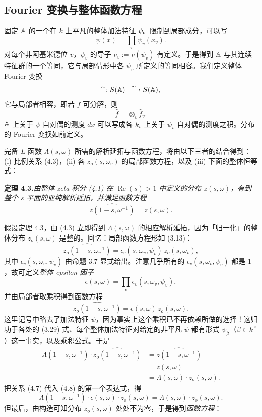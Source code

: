 \subsection*{Fourier 变换与整体函数方程}

固定 $\mathbb{A}$ 的一个在 $k$ 上平凡的整体加法特征 $\psi$。限制到局部成分，可以写
\[
\psi(x)=\prod_v\psi_v(x_v).
\]
对每个非阿基米德位 $v$，$\psi_v$ 的导子 $\nu_v:=\nu(\psi_v)$ 有定义。于是得到 $\mathbb{A}$ 与其连续特征群的一个等同，它与局部情形中各 $\psi_v$ 所定义的等同相容。我们定义整体 Fourier 变换
\[
\widehat{\ }:S(\A)\xrightarrow{\ \sim\ }S(\A),
\]
它与局部者相容，即若 $f$ 可分解，则
\[
\hat f=\otimes_v\hat f_v.
\]
$\mathbb{A}$ 上关于 $\psi$ 自对偶的测度 $dx$ 可以写成各 $k_v$ 上关于 $\psi_v$ 自对偶的测度之积。分布的 Fourier 变换如前定义。

完备 $L$ 函数 $\Lambda(s,\omega)$ 所需的解析延拓与函数方程，将由以下三者的结合得到：(i) 比例关系 (4.3)，(ii) 各 $z_o(s,\omega_v)$ 的局部函数方程，以及 (iii) 下面的整体恒等式：

\medskip\noindent\textbf{定理 4.3.}\quad \emph{由整体 zeta 积分 (4.1) 在 $\operatorname{Re}(s)>1$ 中定义的分布 $z(s,\omega)$，有到整个 $s$ 平面的亚纯解析延拓，并满足函数方程}
\[
\widehat{z(1-s,\omega^{-1})}=z(s,\omega).
\]

假设定理 4.3，由 (4.3) 立即得到 $\Lambda(s,\omega)$ 的相应解析延拓，因为「归一化」的整体分布 $z_o(s,\omega)$ 是整的。回忆：局部函数方程形如 (3.13)：
\[
\widehat{z_o(1-s,\omega_v^{-1})}=\epsilon_v(s,\omega_v,\psi_v)\,z_o(s,\omega_v),
\]
其中 $\epsilon_v(s,\omega_v,\psi_v)$ 由命题 3.7 显式给出。注意几乎所有的 $\epsilon_v(s,\omega_v,\psi_v)$ 都是 $1$，故可定义\emph{整体 epsilon 因子}
\begin{equation*}\tag{4.6}
\epsilon(s,\omega)=\prod_v\epsilon_v(s,\omega_v,\psi_v),
\end{equation*}
并由局部者取乘积得到函数方程
\begin{equation*}\tag{4.7}
\widehat{z_o(1-s,\omega^{-1})}=\epsilon(s,\omega)\,z_o(s,\omega).
\end{equation*}
这里记号中略去了加法特征 $\psi$，因为事实上这个乘积已不再依赖所做的选择！这归功于各处的 (3.29) 式、每个整体加法特征对给定的非平凡 $\psi$ 都有形式 $\psi_\beta$（$\beta\in k^\times$）这一事实，以及乘积公式。于是
\begin{equation*}\tag{4.8}
\begin{aligned}
\Lambda(1-s,\omega^{-1})\cdot\widehat{z_o(1-s,\omega^{-1})}
&=\widehat{z(1-s,\omega^{-1})}\\
&=z(s,\omega)\\
&=\Lambda(s,\omega)\cdot z_o(s,\omega).
\end{aligned}
\end{equation*}
把关系 (4.7) 代入 (4.8) 的第一个表达式，得
\begin{equation*}\tag{4.9}
\Lambda(1-s,\omega^{-1})\cdot\epsilon(s,\omega)\cdot z_o(s,\omega)
=\Lambda(s,\omega)\cdot z_o(s,\omega).
\end{equation*}
但最后，由构造可知分布 $z_o(s,\omega)$ 处处不为零，于是得到\emph{函数方程}：

